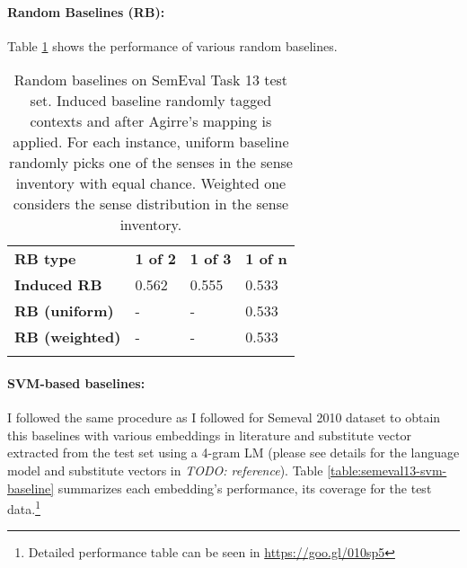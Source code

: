\paragraph{Random Baselines (RB):} Table \ref{table:semeval13-random-baseline} shows the performance of various random baselines. 

\begin{table}
\begin{center}
    \begin{tabular}{  l | l | l | l }
    \Xhline{2\arrayrulewidth}  \bf RB type  & \bf 1 of 2 & \bf 1 of 3 & \bf 1 of n \\ \Xhline{2\arrayrulewidth}
    \bf Induced RB & 0.562 & 0.555 & 0.533 \\ \hline
    \bf RB (uniform) & - & - & 0.533 \\ 
    \bf RB (weighted) & - & - & 0.533 \\ \Xhline{2\arrayrulewidth}
    \end{tabular}
\end{center}
    \caption{\label{table:semeval13-random-baseline} Random baselines on SemEval Task 13 test set. Induced baseline randomly tagged contexts and after Agirre's mapping is applied. For each instance, uniform baseline randomly picks one of the senses in the sense inventory with equal chance. Weighted one considers the sense distribution in the sense inventory.}
\end{table}


\paragraph{SVM-based baselines:} I followed the same procedure as I followed for Semeval 2010 dataset to obtain this baselines with various embeddings in literature and substitute vector extracted from the test set using a 4-gram LM (please see details for the language model and substitute vectors in \emph{TODO: reference}). Table \ref{table:semeval13-svm-baseline} summarizes each embedding's performance, its coverage for the test data.\footnote{Detailed performance table can be seen in \href{https://goo.gl/010sp5}{https://goo.gl/010sp5}}

